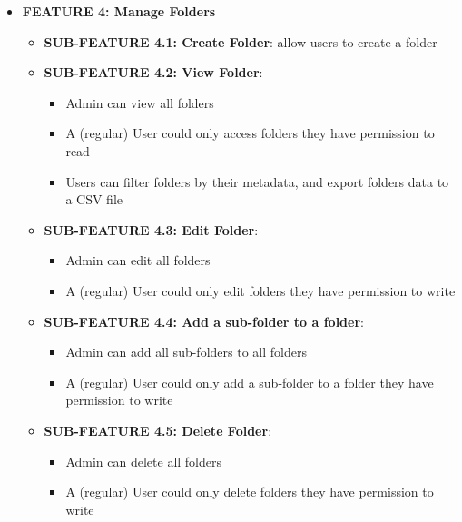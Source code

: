 \begin{itemize}
    \item \textbf{FEATURE 4: Manage Folders}
    \begin{itemize}
        \item \textbf{SUB-FEATURE 4.1: Create Folder}: allow users to create a folder
        \item \textbf{SUB-FEATURE 4.2: View Folder}: 
            \begin{itemize}
                \item Admin can view all folders
                \item A (regular) User could only access folders they have permission to read
                \item Users can filter folders by their metadata, and export folders data to a CSV file
            \end{itemize}
        \item \textbf{SUB-FEATURE 4.3: Edit Folder}: 
            \begin{itemize}
                \item Admin can edit all folders
                \item A (regular) User could only edit folders they have permission to write
            \end{itemize}
        \item \textbf{SUB-FEATURE 4.4: Add a sub-folder to a folder}: 
        \begin{itemize}
            \item Admin can add all sub-folders to all folders
            \item A (regular) User could only add a sub-folder to a folder they have permission to write
        \end{itemize}
        \item \textbf{SUB-FEATURE 4.5: Delete Folder}:
            \begin{itemize}
                \item Admin can delete all folders
                \item A (regular) User could only delete folders they have permission to write
            \end{itemize}
    \end{itemize}
    

\end{itemize}
